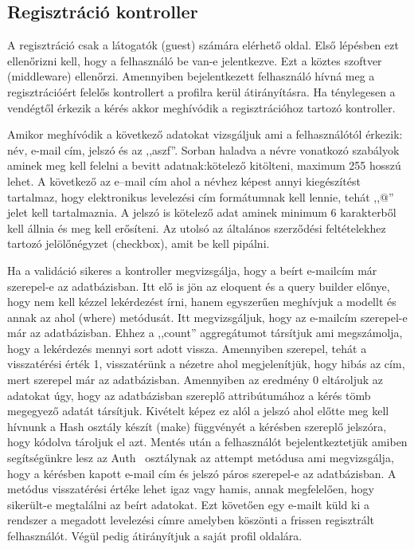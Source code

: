 \documentclass[
]{thesis-ekf}
\theoremstyle{definition}
\theoremstyle{remark}
\begin{document}
\subsection{Regisztráció kontroller}
A regisztráció csak a látogatók (guest) számára elérhető oldal. Első lépésben ezt ellenőrizni kell, hogy a felhasználó be van-e jelentkezve. Ezt a köztes szoftver (middleware) ellenőrzi. Amennyiben bejelentkezett felhasználó hívná meg a regisztrációért felelős kontrollert a profilra kerül átirányításra. Ha ténylegesen a vendégtől érkezik a kérés akkor meghívódik a regisztrációhoz tartozó kontroller.  

Amikor meghívódik a következő adatokat vizsgáljuk ami a felhasználótól érkezik: név, e-mail cím, jelszó és az ,,aszf''.
Sorban haladva a névre vonatkozó szabályok aminek meg kell felelni a bevitt adatnak:kötelező kitölteni, maximum 255 hosszú lehet. A következő az e--mail cím ahol a névhez képest annyi kiegészítést tartalmaz, hogy elektronikus levelezési cím formátumnak kell lennie, tehát ,,@'' jelet kell tartalmaznia.
A jelszó is kötelező adat aminek minimum 6 karakterből kell állnia és meg kell erősíteni. Az utolsó az általános szerződési feltételekhez tartozó jelölőnégyzet (checkbox), amit be kell pipálni.

Ha a validáció sikeres a kontroller megvizsgálja, hogy a beírt e-mailcím már szerepel-e az adatbázisban. Itt elő is jön az eloquent és a query builder előnye, hogy nem kell kézzel lekérdezést írni, hanem egyszerűen meghívjuk a modellt és annak az ahol (where) metódusát. Itt megvizsgáljuk, hogy az e-mailcím szerepel-e már az adatbázisban. Ehhez a ,,count'' aggregátumot társítjuk ami megszámolja, hogy a lekérdezés mennyi sort adott vissza. Amennyiben szerepel, tehát a visszatérési érték 1, visszatérünk a nézetre ahol megjelenítjük, hogy hibás az cím, mert szerepel már az adatbázisban. Amennyiben az eredmény 0 eltároljuk az adatokat úgy, hogy az adatbázisban szereplő attribútumához a kérés tömb megegyező adatát társítjuk. Kivételt képez ez alól a jelszó ahol előtte meg kell hívnunk a Hash osztály készít (make) függvényét a kérésben szereplő jelszóra, hogy kódolva tároljuk el azt. Mentés után a felhasználót bejelentkeztetjük amiben segítségünkre lesz az Auth~\cite{laravel_auth} osztálynak az attempt metódusa ami megvizsgálja, hogy a kérésben kapott e-mail cím és jelszó páros szerepel-e az adatbázisban. A metódus visszatérési értéke lehet igaz vagy hamis, annak megfelelően, hogy sikerült-e megtalálni az beírt adatokat. Ezt követően egy e-mailt küld ki a rendszer a megadott levelezési címre amelyben köszönti a frissen regisztrált felhasználót. Végül pedig átirányítjuk a saját profil oldalára.
\end{document}

